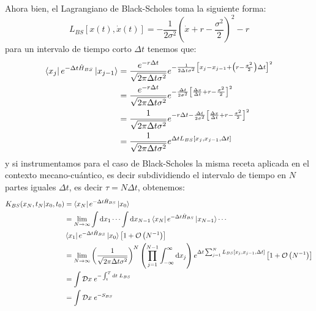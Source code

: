 \documentclass[11pt,a4paper]{article}
\begin{document}
Ahora bien, el Lagrangiano de Black-Scholes toma la siguiente forma:
\begin{equation}
L_{BS} [x(t),\dot{x}(t)] = -\frac{1}{2\sigma^2}\left( \dot{x} + r - \frac{\sigma^2}{2} \right)^2 - r
\label{eq:blackscholeslagrangian2}
\end{equation}
para un intervalo de tiempo corto $\Delta t$ tenemos que:
\begin{equation}
\begin{split}
\bra{x_j}e^{-\Delta t \hat{H}_{BS}}\ket{x_{j-1}} & = \frac{e^{-r\Delta t}}{\sqrt{2\pi\Delta t\sigma^2}}e^{- \frac{1}{2\Delta t\sigma^2}\left[ x_j - x_{j-1} + \left( r - \frac{\sigma^2}{2} \right)\Delta t \right]^2} \\
& = \frac{e^{-r\Delta t}}{\sqrt{2\pi\Delta t\sigma^2}}e^{- \frac{\Delta t}{2\sigma^2}\left[ \frac{\Delta x}{\Delta t} +  r - \frac{\sigma^2}{2} \right]^2} \\
& = \frac{1}{\sqrt{2\pi\Delta t\sigma^2}}e^{-r \Delta t - \frac{\Delta t}{2\sigma^2}\left[ \frac{\Delta x}{\Delta t} +  r - \frac{\sigma^2}{2} \right]^2} \\
& = \frac{1}{\sqrt{2\pi\Delta t\sigma^2}}e^{\Delta t L_{BS} [x_j, x_{j-1}, \Delta t]}
\end{split}
\label{eq:blackscholesamplitude}
\end{equation}
y si instrumentamos para el caso de Black-Scholes la misma receta aplicada en el contexto mecano-cu\'antico, es decir subdividiendo el intervalo de tiempo en $N$ partes iguales $\Delta t$, es decir $\tau = N\Delta t$, obtenemos:
\begin{equation}
\begin{split}
K_{BS}(x_N,t_N|x_0,t_0) & = \bra{x_N}e^{-\Delta t \hat{H}_{BS}}\ket{x_0} \\
& = \lim_{N\rightarrow \infty}\int \mathrm{d}x_1 \cdots \int \mathrm{d}x_{N-1} \bra{x_N}e^{-\Delta t \hat{H}_{BS}}\ket{x_{N-1}} \cdots \\
& \bra{x_1}e^{-\Delta t \hat{H}_{BS}}\ket{x_0} \left[ 1 + \mathcal{O} \left( N^{-1} \right) \right] \\
& = \lim_{N\rightarrow \infty}\left(\frac{1}{\sqrt{2\pi\Delta t\sigma^2}}\right)^N \left( \prod_{j = 1}^{N-1}\int_{-\infty}^{\infty}\mathrm{d}x_j \right) e^{\Delta t \sum_{j=1}^N L_{BS} [x_j, x_{j-1},\Delta t]} \left[ 1 + \mathcal{O} \left( N^{-1} \right) \right] \\
& = \int\mathcal{D}x \; e^{-\int_{t}^{T}\mathrm{d}t \; L_{BS}} \\
& = \int\mathcal{D}x \; e^{-S_{BS}}
\end{split}
\label{eq:blackscholespropagator7}
\end{equation}
\end{document}
